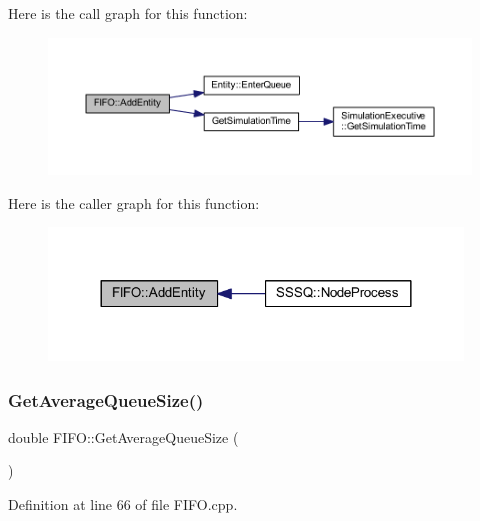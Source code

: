 Here is the call graph for this function\+:\nopagebreak
\begin{figure}[H]
\begin{center}
\leavevmode
\includegraphics[width=350pt]{class_f_i_f_o_a7255ba93981ed0662bc4c26d9983dc9e_cgraph}
\end{center}
\end{figure}
Here is the caller graph for this function\+:\nopagebreak
\begin{figure}[H]
\begin{center}
\leavevmode
\includegraphics[width=312pt]{class_f_i_f_o_a7255ba93981ed0662bc4c26d9983dc9e_icgraph}
\end{center}
\end{figure}
\mbox{\label{class_f_i_f_o_a739f5e90efc37fcea0f66e5548132d5f}} 
\subsubsection{\texorpdfstring{Get\+Average\+Queue\+Size()}{GetAverageQueueSize()}}
{\footnotesize\ttfamily double F\+I\+F\+O\+::\+Get\+Average\+Queue\+Size (\begin{DoxyParamCaption}{ }\end{DoxyParamCaption})}



Definition at line 66 of file F\+I\+F\+O.\+cpp.


